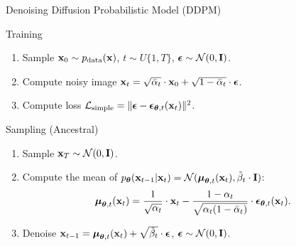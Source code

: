 \documentclass{beamer}
\begin{document}
\begin{frame}{Denoising Diffusion Probabilistic Model (DDPM)}
    \begin{block}{Training}
        \begin{enumerate}
            \item Sample $\mathbf{x}_0 \sim p_{\text{data}}(\mathbf{x})$, $t \sim U\{1, T\}$, $\boldsymbol{\epsilon} \sim \mathcal{N}(0, \mathbf{I})$.
            \item Compute noisy image $\mathbf{x}_t = \sqrt{\bar{\alpha}_t} \cdot \mathbf{x}_0 + \sqrt{1 - \bar{\alpha}_t} \cdot \boldsymbol{\epsilon}$.
            \item Compute loss $ \mathcal{L}_{\text{simple}} = \| \boldsymbol{\epsilon} - \boldsymbol{\epsilon}_{\boldsymbol{\theta}, t}(\mathbf{x}_t) \|^2 $.
        \end{enumerate}
    \end{block}
    \eqpause
    \begin{block}{Sampling (Ancestral)}
        \begin{enumerate}
            \item Sample $\mathbf{x}_T \sim \mathcal{N}(0, \mathbf{I})$.
            \item Compute the mean of $p_{\boldsymbol{\theta}}(\mathbf{x}_{t-1} | \mathbf{x}_t) = \mathcal{N}(\boldsymbol{\mu}_{\boldsymbol{\theta}, t}(\mathbf{x}_t), \tilde{\beta}_t \cdot \mathbf{I})$:
            \vspace{-0.3cm}
            \[
                \boldsymbol{\mu}_{\boldsymbol{\theta}, t}(\mathbf{x}_t) = \frac{1}{\sqrt{\alpha_t}} \cdot \mathbf{x}_t - \frac{1 - \alpha_t}{\sqrt{\alpha_t (1 - \bar{\alpha}_t)}} \cdot \boldsymbol{\epsilon}_{\boldsymbol{\theta}, t}(\mathbf{x}_t).
            \]
            \vspace{-0.5cm}
            \item Denoise $\mathbf{x}_{t - 1} = \boldsymbol{\mu}_{\boldsymbol{\theta}, t}(\mathbf{x}_t) +  \sqrt{\tilde{\beta}_t} \cdot \boldsymbol{\epsilon}$, $\boldsymbol{\epsilon} \sim \mathcal{N}(0, \mathbf{I})$.
        \end{enumerate}
    \end{block}
\end{frame}
\end{document}
